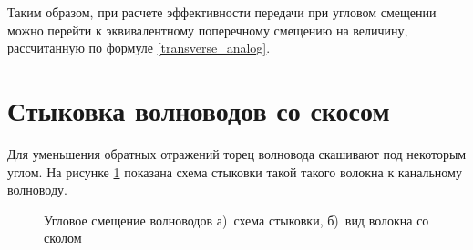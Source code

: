 Таким образом, при расчете эффективности передачи при  угловом смещении можно перейти к эквивалентному поперечному смещению на величину, рассчитанную по формуле \ref{transverse_analog}.

\section{Стыковка волноводов со скосом}
Для уменьшения обратных отражений торец волновода скашивают под некоторым углом. На рисунке \ref{angular_movement} показана схема стыковки такой такого волокна к канальному волноводу.

\begin{figure}[h!]
	\begin{minipage}[h]{0.49\linewidth}
	\end{minipage}
	\hfill
	\begin{minipage}[h]{0.49\linewidth}
	\end{minipage}
	\caption{Угловое смещение волноводов а)~схема стыковки, б)~вид волокна со сколом}
	\label{angular_movement}
\end{figure}

